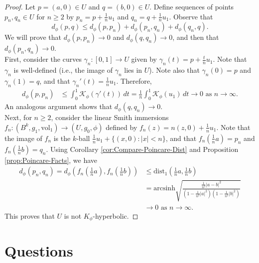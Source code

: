\documentclass[11pt]{article}
\newcommand{\vol}{\mathrm{vol}}
\theoremstyle{definition}
\numberwithin{equation}{section}
\begin{document}
\begin{proof} Let $p = (a,0) \in U$ and $q = (b,0) \in U$.  Define sequences of points $p_n, q_n \in U$ for $n \geq 2$ by $p_n = p + \frac{1}{n}u_1$ and $q_n = q + \frac{1}{n}u_1$.  Observe that
$$d_\phi(p,q) \leq d_\phi( p, p_n) + d_\phi( p_n, q_n) + d_\phi(q_n, q).$$
We will prove that $d_\phi(p, p_n) \to 0$ and $d_\phi(q, q_n) \to 0$, and then that $d_\phi(p_n, q_n) \to 0$. \\
\indent First, consider the curves $\gamma_n \colon [0,1] \to U$ given by $\gamma_n(t) = p + \frac{t}{n}u_1$.   Note that $\gamma_n$ is well-defined (i.e., the image of $\gamma_n$ lies in $U$).  Note also that $\gamma_n(0) = p$ and $\gamma_n(1) = q$, and that $\gamma_n'(t) = \frac{1}{n}u_1$.  Therefore,
\begin{align*}
d_\phi(p, p_n) & \leq \int_0^1 \mathcal{K}_\phi(\gamma'(t))\,dt = \frac{1}{n} \int_0^1 \mathcal{K}_\phi(u_1)\,dt \to 0 \text{ as } n \to \infty.
\end{align*}
An analogous argument shows that $d_\phi(q, q_n) \to 0$. \\
\indent Next, for $n \geq 2$, consider the linear Smith immersions $f_n \colon (B^k, g_1, \vol_1) \to (U, g_0, \phi)$ defined by $f_n(z) = n(z,0) + \frac{1}{n}u_1$.  Note that the image of $f_n$ is the $k$-ball $\frac{1}{n}u_1 + \{(x,0) \colon |x| < n\}$, and that $f_n(\frac{1}{n}a) = p_n$ and $f_n(\frac{1}{n}b) = q_n$.  Using Corollary \ref{cor:Compare-Poincare-Dist} and Proposition \ref{prop:Poincare-Facts}, we have
\begin{align*}
d_\phi( p_n, q_n) = d_\phi\!\left( f_n\!\left(\frac{1}{n}a\right), f_n\!\left(\frac{1}{n}b\right) \right) & \leq \mathrm{dist}_1\!\left( \frac{1}{n}a, \frac{1}{n}b\right) \\
& = \mathrm{arcsinh} \sqrt{ \frac{ \frac{1}{n^2} \left| a-b \right|^2 }{ (1 - \frac{1}{n^2}|a|^2) (1 - \frac{1}{n^2}|b|^2) } } \\
& \to 0 \text{ as } n \to \infty.
\end{align*}
This proves that $U$ is not $K_\phi$-hyperbolic.
\end{proof}

\section{Questions}
\end{document}
